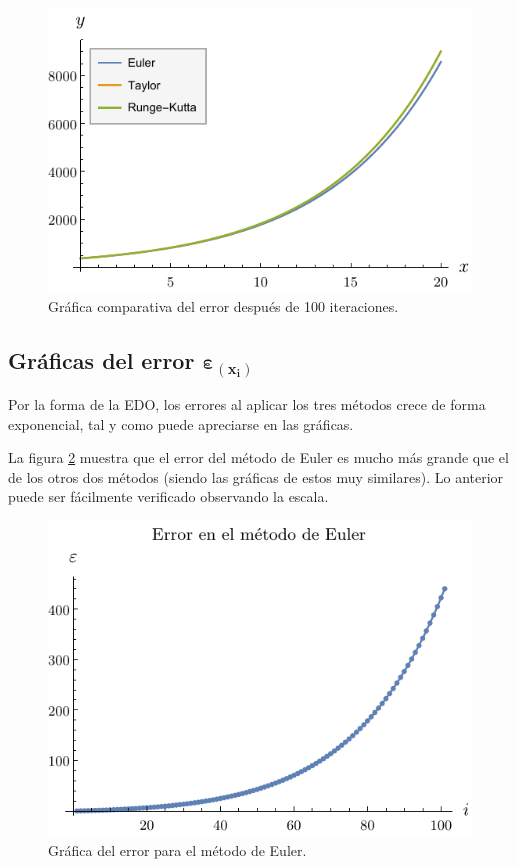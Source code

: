 \documentclass[
    english, spanish, Ce-table, Ce-theorem
]{CabesHW}
\begin{document}
\begin{figure}[H]
    \centering
    \includegraphics{imgs/plot-comp.pdf}
    \caption{Gráfica comparativa del error después de 100 iteraciones.}
    \label{fig:comp}
\end{figure}

\vspace{1em}
\subsection[Gráficas del error]{Gráficas del error $\boldsymbol{\varepsilon_{(x_i)}}$}
Por la forma de la EDO, los errores al aplicar los tres métodos crece de forma exponencial, tal y como puede apreciarse en las gráficas.

La figura \ref{fig:euler} muestra que el error del método de Euler es mucho más grande que el de los otros dos métodos (siendo las gráficas de estos muy similares). Lo anterior puede ser fácilmente verificado observando la escala.

\begin{figure}[H]
    \centering
    \includegraphics{imgs/plot-euler.pdf}
    \caption{Gráfica del error para el método de Euler.}
    \label{fig:euler}
\end{figure}
\end{document}
